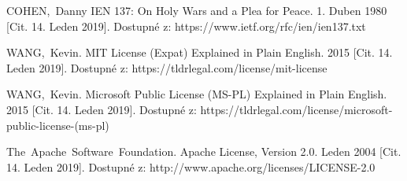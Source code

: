 \documentclass[conference]{IEEEtran}
\begin{document}
\begin{thebibliography}{1}
COHEN,~Danny IEN 137: On Holy Wars and a Plea for Peace. 1. Duben 1980 [Cit. 14. Leden 2019]. Dostupné z: https://www.ietf.org/rfc/ien/ien137.txt

WANG,~Kevin. MIT License (Expat) Explained in Plain English. 2015 [Cit. 14. Leden 2019]. Dostupné z: https://tldrlegal.com/license/mit-license

WANG,~Kevin. Microsoft Public License (MS-PL) Explained in Plain English. 2015 [Cit. 14. Leden 2019]. Dostupné z: https://tldrlegal.com/license/microsoft-public-license-(ms-pl)

The~Apache~Software~Foundation. Apache License, Version 2.0. Leden 2004 [Cit. 14. Leden 2019]. Dostupné z: http://www.apache.org/licenses/LICENSE-2.0

\end{thebibliography}
\end{document}
